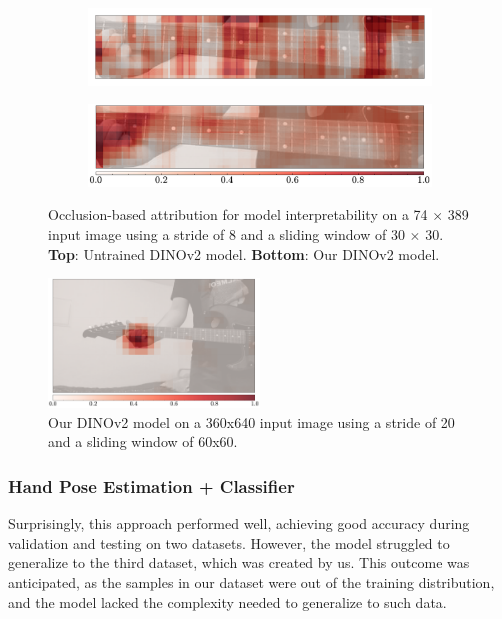 \documentclass[10pt,twocolumn,letterpaper]{article}
\begin{document}
\begin{figure}[h]
    \centering
    \begin{subfigure}[t]{0.5\textwidth}
        \centering
        \includegraphics[width=\textwidth]{images/final/occlusion_untrained.pdf}
    \end{subfigure}
    \begin{subfigure}[t]{0.5\textwidth}
        \centering
        \includegraphics[width=\textwidth]{images/final/occlusion_trained.pdf}
    \end{subfigure}
    \caption{Occlusion-based attribution \cite{kokhlikyan2020captum} for model interpretability on a 74 $\times$ 389 input image using a stride of 8 and a sliding window of 30 $\times$ 30. \textbf{Top}: Untrained DINOv2 model. \textbf{Bottom}: Our DINOv2 model.}
    \label{fig:chord-classifier-visualization-fretboard}
\end{figure}

\begin{figure}[h]
    \centering
    \includegraphics[width=0.5\textwidth]{images/final/occlusion_trained_full.pdf}
    \caption{Our DINOv2 model on a 360x640 input image using a stride of 20 and a sliding window of 60x60.}
    \label{fig:chord-classifier-visualization-fretboard-2}
\end{figure}

\subsubsection{Hand Pose Estimation + Classifier}
Surprisingly, this approach performed well, achieving good accuracy during validation and testing on two datasets. However, the model struggled to generalize to the third dataset, which was created by us. This outcome was anticipated, as the samples in our dataset were out of the training distribution, and the model lacked the complexity needed to generalize to such data.
\end{document}
